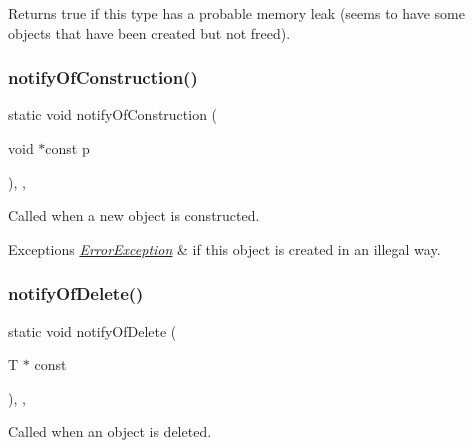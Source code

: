 Returns true if this type has a probable memory leak (seems to have some objects that have been created but not freed). 

\mbox{\label{classManaged_a8c9fc6e457eee241a98aa675a241642a}} 
\subsubsection{\texorpdfstring{notify\+Of\+Construction()}{notifyOfConstruction()}}
{\footnotesize\ttfamily static void notify\+Of\+Construction (\begin{DoxyParamCaption}\item[{void $\ast$const}]{p }\end{DoxyParamCaption})\hspace{0.3cm}{\ttfamily [inline]}, {\ttfamily [static]}, {\ttfamily [protected]}}



Called when a new object is constructed. 


\begin{DoxyExceptions}{Exceptions}
{\em \mbox{\hyperlink{classErrorException}{Error\+Exception}}} & if this object is created in an illegal way. \\
\hline
\end{DoxyExceptions}
\mbox{\label{classManaged_a5077633649d2c853d0b800e0722da369}} 
\subsubsection{\texorpdfstring{notify\+Of\+Delete()}{notifyOfDelete()}}
{\footnotesize\ttfamily static void notify\+Of\+Delete (\begin{DoxyParamCaption}\item[{T $\ast$}]{const }\end{DoxyParamCaption})\hspace{0.3cm}{\ttfamily [inline]}, {\ttfamily [static]}, {\ttfamily [protected]}}



Called when an object is deleted. 

\mbox{\label{classManaged_a86107594327f3a001230df9802cd4422}} 
